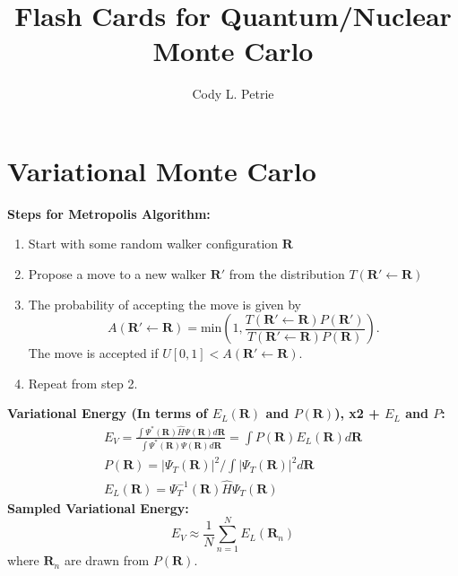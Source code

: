 \documentclass[12pt]{extarticle}
\title{Flash Cards for Quantum/Nuclear Monte Carlo}
\author{Cody L. Petrie}
\newcommand{\R}{\mathrm{\mathbf{R}}}
\begin{document}
\maketitle

\section*{Variational Monte Carlo}
\textbf{Steps for Metropolis Algorithm:}
\begin{enumerate}
   \item{Start with some random walker configuration $\R$}
   \item{Propose a move to a new walker $\R'$ from the distribution $T(\R'\leftarrow\R)$}
   \item{The probability of accepting the move is given by \[A(\R'\leftarrow\R) = \mathrm{min}\left(1,\frac{T(\R'\leftarrow\R)P(\R')}{T(\R'\leftarrow\R)P(\R)}\right).\] The move is accepted if $U[0,1]<A(\R'\leftarrow\R)$.}
   \item{Repeat from step 2.}
\end{enumerate}
\textbf{Variational Energy (In terms of $E_L(\R)$ and $P(\R)$), x2 + $E_L$ and $P$:}
\begin{align*}
   E_V = \frac{\int\Psi^*(\R)\hat{H}\Psi(\R)d\R}{\int\Psi^*(\R)\Psi(\R)d\R} = \int P(\R)E_L(\R)d\R \\ P(\R) = |\Psi_T(\R)|^2/\int |\Psi_T(\R)|^2d\R\ \\ E_L(\R) = \Psi_T^{-1}(\R)\hat{H}\Psi_T(\R)
\end{align*}
\textbf{Sampled Variational Energy:}
\begin{equation*}
   E_V \approx \frac{1}{N}\sum\limits_{n=1}^N E_L(\R_n)
\end{equation*}
where $\R_n$ are drawn from $P(\R)$.
\end{document}
